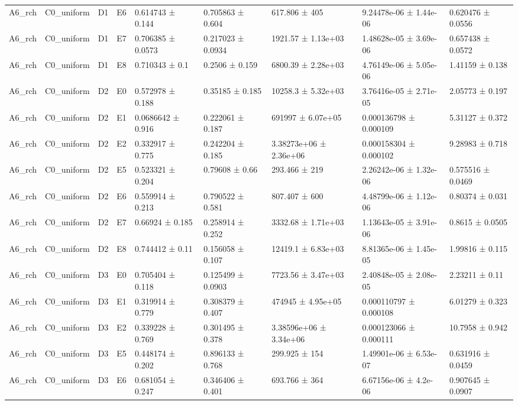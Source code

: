 \begin{table}
\begin{tabular}{lllllllll}
A6\_rch & C0\_uniform & D1 & E6 & 0.614743 ± 0.144 & 0.705863 ± 0.604 & 617.806 ± 405 & 9.24478e-06 ± 1.44e-06 & 0.620476 ± 0.0556 \\
A6\_rch & C0\_uniform & D1 & E7 & 0.706385 ± 0.0573 & 0.217023 ± 0.0934 & 1921.57 ± 1.13e+03 & 1.48628e-05 ± 3.69e-06 & 0.657438 ± 0.0572 \\
A6\_rch & C0\_uniform & D1 & E8 & 0.710343 ± 0.1 & 0.2506 ± 0.159 & 6800.39 ± 2.28e+03 & 4.76149e-06 ± 5.05e-06 & 1.41159 ± 0.138 \\
A6\_rch & C0\_uniform & D2 & E0 & 0.572978 ± 0.188 & 0.35185 ± 0.185 & 10258.3 ± 5.32e+03 & 3.76416e-05 ± 2.71e-05 & 2.05773 ± 0.197 \\
A6\_rch & C0\_uniform & D2 & E1 & 0.0686642 ± 0.916 & 0.222061 ± 0.187 & 691997 ± 6.07e+05 & 0.000136798 ± 0.000109 & 5.31127 ± 0.372 \\
A6\_rch & C0\_uniform & D2 & E2 & 0.332917 ± 0.775 & 0.242204 ± 0.185 & 3.38273e+06 ± 2.36e+06 & 0.000158304 ± 0.000102 & 9.28983 ± 0.718 \\
A6\_rch & C0\_uniform & D2 & E5 & 0.523321 ± 0.204 & 0.79608 ± 0.66 & 293.466 ± 219 & 2.26242e-06 ± 1.32e-06 & 0.575516 ± 0.0469 \\
A6\_rch & C0\_uniform & D2 & E6 & 0.559914 ± 0.213 & 0.790522 ± 0.581 & 807.407 ± 600 & 4.48799e-06 ± 1.12e-06 & 0.80374 ± 0.031 \\
A6\_rch & C0\_uniform & D2 & E7 & 0.66924 ± 0.185 & 0.258914 ± 0.252 & 3332.68 ± 1.71e+03 & 1.13643e-05 ± 3.91e-06 & 0.8615 ± 0.0505 \\
A6\_rch & C0\_uniform & D2 & E8 & 0.744412 ± 0.11 & 0.156058 ± 0.107 & 12419.1 ± 6.83e+03 & 8.81365e-06 ± 1.45e-05 & 1.99816 ± 0.115 \\
A6\_rch & C0\_uniform & D3 & E0 & 0.705404 ± 0.118 & 0.125499 ± 0.0903 & 7723.56 ± 3.47e+03 & 2.40848e-05 ± 2.08e-05 & 2.23211 ± 0.11 \\
A6\_rch & C0\_uniform & D3 & E1 & 0.319914 ± 0.779 & 0.308379 ± 0.407 & 474945 ± 4.95e+05 & 0.000110797 ± 0.000108 & 6.01279 ± 0.323 \\
A6\_rch & C0\_uniform & D3 & E2 & 0.339228 ± 0.769 & 0.301495 ± 0.378 & 3.38596e+06 ± 3.34e+06 & 0.000123066 ± 0.000111 & 10.7958 ± 0.942 \\
A6\_rch & C0\_uniform & D3 & E5 & 0.448174 ± 0.202 & 0.896133 ± 0.768 & 299.925 ± 154 & 1.49901e-06 ± 6.53e-07 & 0.631916 ± 0.0459 \\
A6\_rch & C0\_uniform & D3 & E6 & 0.681054 ± 0.247 & 0.346406 ± 0.401 & 693.766 ± 364 & 6.67156e-06 ± 4.2e-06 & 0.907645 ± 0.0907 \\

\end{tabular}
\end{table}
